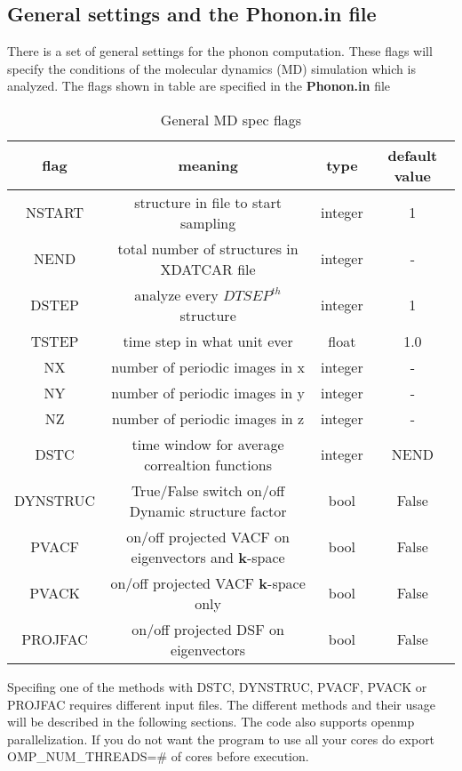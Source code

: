 \documentclass[a4paper,12pt]{article}
\begin{document}
\subsection{General settings and the Phonon.in file}
There is a set of general settings for the phonon computation.
These flags will specify the conditions of the molecular dynamics (MD)
simulation which is analyzed.
The flags shown in table are specified in the \textbf{Phonon.in} file

\begin{table}[h!]
	\centering
	\caption{General MD spec flags}
\begin{tabular}{ |c|c|c|c| }
 \hline
	flag & meaning & type & default value \\ 
 \hline
	NSTART & structure in file to start sampling & integer & 1 \\  
	NEND   & total number of structures in XDATCAR file & integer & - \\
	DSTEP  & analyze every $DTSEP^{th}$ structure & integer & 1 \\
	TSTEP  & time step in what unit ever    & float & 1.0 \\
	NX     & number of periodic images in x & integer & - \\
	NY     & number of periodic images in y & integer & - \\
	NZ     & number of periodic images in z & integer & - \\
	DSTC   & time window for average correaltion functions & integer & NEND \\
	DYNSTRUC & True/False switch on/off Dynamic structure factor & bool & False\\
	PVACF   & on/off projected VACF on eigenvectors and $\mathbf{k}$-space & bool & False\\
	PVACK & on/off projected VACF $\mathbf{k}$-space only & bool & False\\
	PROJFAC & on/off projected DSF on eigenvectors & bool & False\\
 \hline
\end{tabular}
\end{table}

Specifing one of the methods with DSTC, DYNSTRUC, PVACF, PVACK or PROJFAC requires
different input files. The different methods and their usage will be described in the
following sections. The code also supports openmp parallelization. If you do not want
the program to use all your cores do export OMP\_NUM\_THREADS=\# of cores before execution.
\end{document}
